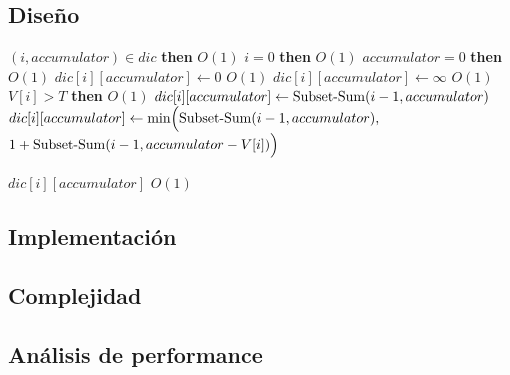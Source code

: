 \subsection{Diseño}
\begin{codebox}
		\li \If $(i, accumulator) \in dic$ \textbf{then}				\RComment $O(1)$
		\li \Then
			\If $i = 0$ \textbf{then}									\RComment $O(1)$
			\li \Then
				\If $accumulator = 0$ \textbf{then}						\RComment $O(1)$
				\li \Then
					 $dic[i][accumulator] \leftarrow 0$ 				\RComment $O(1)$
					  \li
				\Else
					\li $dic[i][accumulator] \leftarrow \infty$ 		\RComment $O(1)$
					\li
				\End
			\Else
				\li \If $V[i] > T$ \textbf{then}						\RComment $O(1)$
				\li \Then
					 $dic[i][accumulator] \leftarrow \func{Subset-Sum}(i - 1, accumulator)$
					 \li
				\Else
					\li $dic[i][accumulator] \leftarrow \func{min}\Big(\func{Subset-Sum}(i - 1, accumulator),$
					\Indentmore \li $1 + \func{Subset-Sum}(i - 1, accumulator - V[i])\Big)$
				\End
			\End
		\End

		\zi
		\li \Return $dic[i][accumulator]$								\RComment $O(1)$
	\End
\end{codebox}

\subsection{Implementación}
\subsection{Complejidad}
\subsection{Análisis de performance}